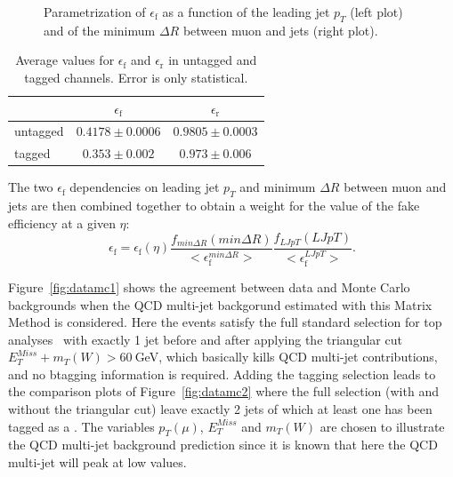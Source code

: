 \begin{figure}
\caption{Parametrization of $\epsilon_\mathrm{f}$ as a function of the leading jet $p_T$ (left plot) and of the minimum $\Delta R$ between muon and jets (right plot). }\label{fig:ljptmindrDep}
\end{figure} 

\begin{table}\centering
\begin{tabular}{l c c }
\toprule
 & $\epsilon_\mathrm{f}$ &  $\epsilon_\mathrm{r}$  \\\midrule
untagged & $0.4178 \pm 0.0006 $ & $ 0.9805 \pm 0.0003 $ \\
tagged   & $0.353  \pm 0.002 $ & $ 0.973 \pm 0.006 $ \\\bottomrule
\end{tabular}\caption{Average values for $\epsilon_\mathrm{f}$ and  $\epsilon_\mathrm{r}$ in untagged and tagged channels. Error is only statistical.}\label{tab:averageeffs}
\end{table} 

The two $\epsilon_\mathrm{f}$ dependencies on  
leading jet $p_T$ and minimum $\Delta R$ between muon and 
jets  are then combined together to obtain a weight for the value of 
the fake efficiency at a given $\eta$:
\begin{equation}
\epsilon_\mathrm{f} = \epsilon_\mathrm{f}(\eta) \dfrac{f_{min\Delta R}(min\Delta R)}{<\epsilon_\mathrm{f}^{min\Delta R}>}\dfrac{f_{LJpT}(LJpT)}{<\epsilon_\mathrm{f}^{LJpT}>}.
\end{equation}

Figure~\ref{fig:datamc1} shows the agreement between data and Monte Carlo 
backgrounds 
when the QCD multi-jet backgorund estimated with this Matrix Method 
is considered. Here the events satisfy the full standard 
selection for top analyses~\cite{topCommonObjects2012} with 
exactly 1 jet before and after applying the triangular cut 
$E_T^{Miss} + m_T(W)>60~$GeV, which basically kills QCD multi-jet
contributions, and no btagging information is 
required. Adding the tagging selection leads to the comparison 
plots of Figure~\ref{fig:datamc2} where the full selection (with 
and without the triangular cut) leave exactly 2 jets of which at 
least one has been tagged as a \bjet. The variables $p_T(\mu)$, 
$E_T^{Miss}$ and $m_T(W)$ are chosen to illustrate the QCD multi-jet 
background prediction since it is known that here the QCD multi-jet will peak at 
low values. 




